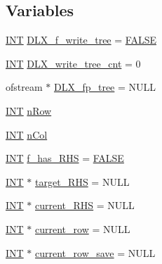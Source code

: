 \subsection*{Variables}
\begin{DoxyCompactItemize}
\item 
\mbox{\hyperlink{galois_8h_a09fddde158a3a20bd2dcadb609de11dc}{I\+NT}} \mbox{\hyperlink{_l_i_b_2_g_a_l_o_i_s_2dlx_8_c_ad0dca28b90a8d00445d46de8b2abeb25}{D\+L\+X\+\_\+f\+\_\+write\+\_\+tree}} = \mbox{\hyperlink{nauty_8h_aa93f0eb578d23995850d61f7d61c55c1}{F\+A\+L\+SE}}
\item 
\mbox{\hyperlink{galois_8h_a09fddde158a3a20bd2dcadb609de11dc}{I\+NT}} \mbox{\hyperlink{_l_i_b_2_g_a_l_o_i_s_2dlx_8_c_a1140bd513a612dd467c8149d6c6e835a}{D\+L\+X\+\_\+write\+\_\+tree\+\_\+cnt}} = 0
\item 
ofstream $\ast$ \mbox{\hyperlink{_l_i_b_2_g_a_l_o_i_s_2dlx_8_c_a173e5681dbd0dbf54bc30d7de0cb61ee}{D\+L\+X\+\_\+fp\+\_\+tree}} = N\+U\+LL
\item 
\mbox{\hyperlink{galois_8h_a09fddde158a3a20bd2dcadb609de11dc}{I\+NT}} \mbox{\hyperlink{_l_i_b_2_g_a_l_o_i_s_2dlx_8_c_aec7d6fbaf036f4ceb23f0ca6c9bf2a7e}{n\+Row}}
\item 
\mbox{\hyperlink{galois_8h_a09fddde158a3a20bd2dcadb609de11dc}{I\+NT}} \mbox{\hyperlink{_l_i_b_2_g_a_l_o_i_s_2dlx_8_c_a349bca9334a894bda975b26515f1c7ac}{n\+Col}}
\item 
\mbox{\hyperlink{galois_8h_a09fddde158a3a20bd2dcadb609de11dc}{I\+NT}} \mbox{\hyperlink{_l_i_b_2_g_a_l_o_i_s_2dlx_8_c_a23aa336217bd6f169787e905aad67c95}{f\+\_\+has\+\_\+\+R\+HS}} = \mbox{\hyperlink{nauty_8h_aa93f0eb578d23995850d61f7d61c55c1}{F\+A\+L\+SE}}
\item 
\mbox{\hyperlink{galois_8h_a09fddde158a3a20bd2dcadb609de11dc}{I\+NT}} $\ast$ \mbox{\hyperlink{_l_i_b_2_g_a_l_o_i_s_2dlx_8_c_a1f0784113f26d82c71ea675c9ee3c54b}{target\+\_\+\+R\+HS}} = N\+U\+LL
\item 
\mbox{\hyperlink{galois_8h_a09fddde158a3a20bd2dcadb609de11dc}{I\+NT}} $\ast$ \mbox{\hyperlink{_l_i_b_2_g_a_l_o_i_s_2dlx_8_c_ad01b7eb2994773088ad41c9854094c45}{current\+\_\+\+R\+HS}} = N\+U\+LL
\item 
\mbox{\hyperlink{galois_8h_a09fddde158a3a20bd2dcadb609de11dc}{I\+NT}} $\ast$ \mbox{\hyperlink{_l_i_b_2_g_a_l_o_i_s_2dlx_8_c_a38cc8ec34940a6f62ff32892f4e09db8}{current\+\_\+row}} = N\+U\+LL
\item 
\mbox{\hyperlink{galois_8h_a09fddde158a3a20bd2dcadb609de11dc}{I\+NT}} $\ast$ \mbox{\hyperlink{_l_i_b_2_g_a_l_o_i_s_2dlx_8_c_aace33a8f9ee0ff1cd1a42854b5014413}{current\+\_\+row\+\_\+save}} = N\+U\+LL

\end{DoxyCompactItemize}
